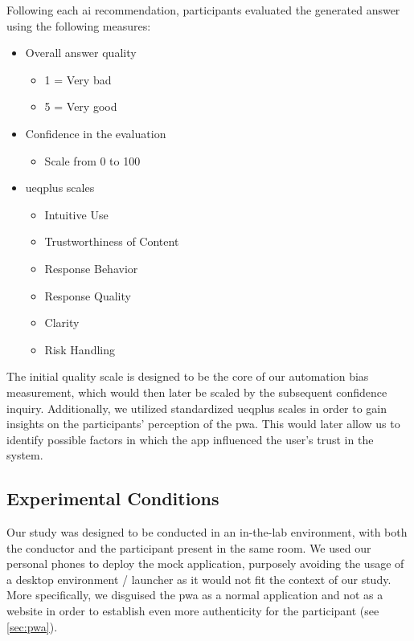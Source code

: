 \documentclass[sigconf,natbib=false]{acmart}
\begin{document}
Following each \Gls{ai} recommendation, participants evaluated the generated answer using the following measures:

\begin{itemize}
\item Overall answer quality
\begin{itemize}
\item 1 = Very bad
\item 5 = Very good
\end{itemize}

\item Confidence in the evaluation
\begin{itemize}
    \item Scale from 0 to 100
\end{itemize}

\item \gls{ueqplus} scales
\begin{itemize}
    \item Intuitive Use
    \item Trustworthiness of Content
    \item Response Behavior
    \item Response Quality
    \item Clarity
    \item Risk Handling
\end{itemize}

\end{itemize}

The initial quality scale is designed to be the core of our automation bias measurement, which would then later be scaled by the subsequent confidence inquiry.
Additionally, we utilized standardized \gls{ueqplus} scales in order to gain insights on the participants' perception of the \gls{pwa}.
This would later allow us to identify possible factors in which the app influenced the user's trust in the system.

\subsection{Experimental Conditions}

Our study was designed to be conducted in an in-the-lab environment, with both the conductor and the participant present in the same room.
We used our personal phones to deploy the mock application, purposely avoiding the usage of a desktop environment / launcher as it would not fit the context of our study.
More specifically, we disguised the \Gls{pwa} as a normal application and not as a website in order to establish even more authenticity for the participant (see \ref{sec:pwa}).
\end{document}

